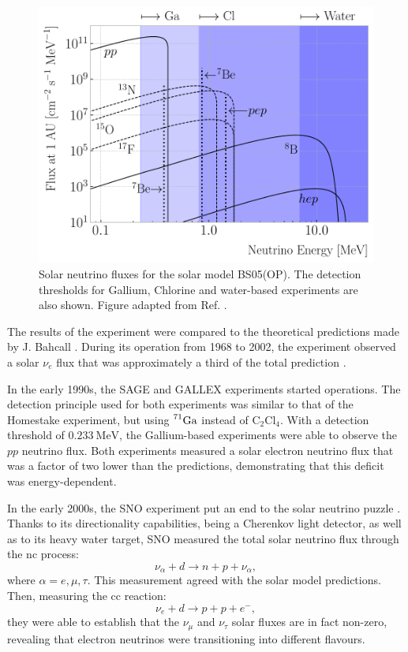 \begin{figure}[t]
	\centering
	\includegraphics[width=.75\linewidth]{Images/Nu/solar_neutrino_flux.pdf}
	\caption[Solar neutrino fluxes for the solar model BS05(OP).]{Solar neutrino fluxes for the solar model BS05(OP). The detection thresholds for Gallium, Chlorine and water-based experiments are also shown. Figure adapted from Ref. \cite{Bahcall2004}.}
	\label{fig:solar_nu_flux}
\end{figure}

The results of the experiment were compared to the theoretical predictions made by J. Bahcall \cite{Bahcall1968}. During its operation from 1968 to 2002, the experiment observed a solar $\nu_{e}$ flux that was approximately a third of the total prediction \cite{Cleveland1998}.

In the early 1990s, the SAGE \cite{SAGE2009} and GALLEX \cite{GALLEX2010} experiments started operations. The detection principle used for both experiments was similar to that of the Homestake experiment, but using $\prescript{71}{}{\mathrm{Ga}}$ instead of $\mathrm{C}_{2}\mathrm{Cl}_{4}$. With a detection threshold of $0.233~\mathrm{MeV}$, the Gallium-based experiments were able to observe the $pp$ neutrino flux. Both experiments measured a solar electron neutrino flux that was a factor of two lower than the predictions, demonstrating that this deficit was energy-dependent.

In the early 2000s, the SNO experiment put an end to the solar neutrino puzzle \cite{Ahmad2001,Ahmad2002}. Thanks to its directionality capabilities, being a Cherenkov light detector, as well as to its heavy water target, SNO measured the total solar neutrino flux through the \gls{nc} process:
\begin{equation}
	\nu_{\alpha} + d \longrightarrow n + p + \nu_{\alpha},
\end{equation}
where $\alpha = e, \mu, \tau$. This measurement agreed with the solar model predictions. Then, measuring the \gls{cc} reaction:
\begin{equation}
	\nu_{e} + d \longrightarrow p + p + e^{-},
\end{equation}
they were able to establish that the $\nu_{\mu}$ and $\nu_{\tau}$ solar fluxes are in fact non-zero, revealing that electron neutrinos were transitioning into different flavours.

